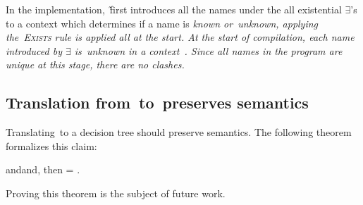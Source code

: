\documentclass[manuscript,screen, 12pt, nonacm]{acmart}
\begin{document}
      In the implementation,~\DTran\~first introduces all the names under the
      all existential $\exists$'s to a context which determines if a name is
      \it{known} or~\it{unknown}, applying the~\textsc{Exists} rule is applied
      all at the start. At the start of compilation, each name introduced by
      $\exists$ is~\it{unknown} in a context~\ctx. Since all names in the
      program are unique at this stage, there are no clashes. 

    \subsection{Translation from~\VMinus to~\D preserves semantics}
    
    Translating~\iffibf to a decision tree should preserve semantics. The
    following theorem formalizes this claim: 

    \begin{theorem}
      \vmeval[result={\result[1]}]\;and\;\compilebig[iffi=\expr,
      compiled=\expr']\;and\;\vmeval[exp=\expr', result={\result[2]}], then
      {\result[1]} = {\result[2]}. 
    \end{theorem}

    Proving this theorem is the subject of future work. 
\end{document}
